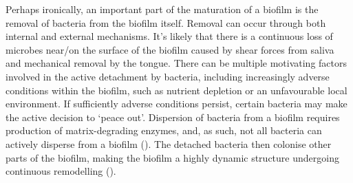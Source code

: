 \documentclass[
  b5paper,
]{book}
\begin{document}
Perhaps ironically, an important part of the maturation of a biofilm is
the removal of bacteria from the biofilm itself. Removal can occur
through both internal and external mechanisms. It's likely that there is
a continuous loss of microbes near/on the surface of the biofilm caused
by shear forces from saliva and mechanical removal by the tongue. There
can be multiple motivating factors involved in the active detachment by
bacteria, including increasingly adverse conditions within the biofilm,
such as nutrient depletion or an unfavourable local environment. If
sufficiently adverse conditions persist, certain bacteria may make the
active decision to `peace out'. Dispersion of bacteria from a biofilm
requires production of matrix-degrading enzymes, and, as such, not all
bacteria can actively disperse from a biofilm
(). The
detached bacteria then colonise other parts of the biofilm, making the
biofilm a highly dynamic structure undergoing continuous remodelling
().
\end{document}
